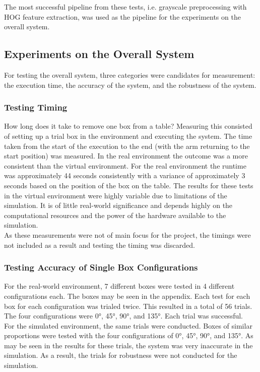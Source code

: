 \documentclass[letterpaper, 10 pt, conference]{conf/ieeeconf}  %
\begin{document}
The most successful pipeline from these tests, i.e. grayscale preprocessing with
HOG feature extraction, was used as the pipeline for the experiments on the
overall system.

\subsection{Experiments on the Overall System}
For testing the overall system, three categories were candidates for
measurement: the execution time, the accuracy of the system, and the robustness
of the system.\\
\subsubsection{Testing Timing}
How long does it take to remove one box from a table? Measuring this consisted
of setting up a trial box in the environment and executing the system. The time
taken from the start of the execution to the end (with the arm returning to the
start position) was measured. In the real environment the outcome was a more
consistent than the virtual environment. For the real environment the runtime
was approximately 44 seconds consistently with a variance of approximately 3
seconds based on the position of the box on the table. The results for these
tests in the virtual environment were highly variable due to limitations of the
simulation. It is of little real-world significance and depends highly on the
computational resources and the power of the hardware available to the
simulation.\\

As these measurements were not of main focus for the project, the timings were not
included as a result and testing the timing was discarded.\\

\subsubsection{Testing Accuracy of Single Box Configurations}
For the real-world environment, 7 different boxes were tested in 4 different
configurations each. The boxes may be seen in the appendix. Each test for each
box for each configuration was trialed twice. This resulted in a total of 56
trials. The four configurations were \ang{0}, \ang{45}, \ang{90}, and \ang{135}.
Each trial was successful.\\

For the simulated environment, the same trials were conducted. Boxes of similar
proportions were tested with the four configurations of \ang{0}, \ang{45},
\ang{90}, and \ang{135}. As may be seen in the results for these trials, the
system was very inaccurate in the simulation. As a result, the trials for
robustness were not conducted for the simulation.\\
\end{document}
